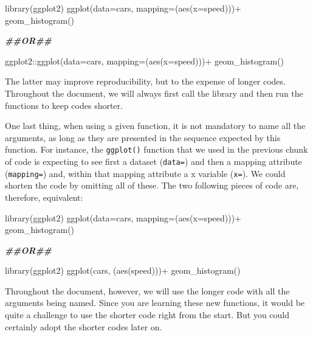 \documentclass[
]{book}
\newenvironment{Shaded}{\begin{snugshade}}{\end{snugshade}}
\newcommand{\AttributeTok}[1]{\textcolor[rgb]{0.77,0.63,0.00}{#1}}
\newcommand{\DocumentationTok}[1]{\textcolor[rgb]{0.56,0.35,0.01}{\textbf{\textit{#1}}}}
\newcommand{\FunctionTok}[1]{\textcolor[rgb]{0.00,0.00,0.00}{#1}}
\newcommand{\NormalTok}[1]{#1}
\newcommand{\SpecialCharTok}[1]{\textcolor[rgb]{0.00,0.00,0.00}{#1}}
\begin{document}
\begin{Shaded}
\begin{Highlighting}[]
\FunctionTok{library}\NormalTok{(ggplot2)}
\FunctionTok{ggplot}\NormalTok{(}\AttributeTok{data=}\NormalTok{cars, }\AttributeTok{mapping=}\NormalTok{(}\FunctionTok{aes}\NormalTok{(}\AttributeTok{x=}\NormalTok{speed)))}\SpecialCharTok{+}
  \FunctionTok{geom\_histogram}\NormalTok{()}

\DocumentationTok{\#\#OR\#\#}

\NormalTok{ggplot2}\SpecialCharTok{::}\FunctionTok{ggplot}\NormalTok{(}\AttributeTok{data=}\NormalTok{cars, }\AttributeTok{mapping=}\NormalTok{(}\FunctionTok{aes}\NormalTok{(}\AttributeTok{x=}\NormalTok{speed)))}\SpecialCharTok{+}
  \FunctionTok{geom\_histogram}\NormalTok{()}
\end{Highlighting}
\end{Shaded}

The latter may improve reproducibility, but to the expense of longer
codes. Throughout the document, we will always first call the library
and then run the functions to keep codes shorter.

One last thing, when using a given function, it is not mandatory to name
all the arguments, as long as they are presented in the sequence
expected by this function. For instance, the \texttt{ggplot()} function
that we used in the previous chunk of code is expecting to see first a
dataset (\texttt{data=}) and then a mapping attribute
(\texttt{mapping=}) and, within that mapping attribute a x variable
(\texttt{x=}). We could shorten the code by omitting all of these. The
two following pieces of code are, therefore, equivalent:

\begin{Shaded}
\begin{Highlighting}[]
\FunctionTok{library}\NormalTok{(ggplot2)}
\FunctionTok{ggplot}\NormalTok{(}\AttributeTok{data=}\NormalTok{cars, }\AttributeTok{mapping=}\NormalTok{(}\FunctionTok{aes}\NormalTok{(}\AttributeTok{x=}\NormalTok{speed)))}\SpecialCharTok{+}
  \FunctionTok{geom\_histogram}\NormalTok{()}

\DocumentationTok{\#\#OR\#\#  }

\FunctionTok{library}\NormalTok{(ggplot2)}
\FunctionTok{ggplot}\NormalTok{(cars, (}\FunctionTok{aes}\NormalTok{(speed)))}\SpecialCharTok{+}
  \FunctionTok{geom\_histogram}\NormalTok{()}
\end{Highlighting}
\end{Shaded}

Throughout the document, however, we will use the longer code with all
the arguments being named. Since you are learning these new functions,
it would be quite a challenge to use the shorter code right from the
start. But you could certainly adopt the shorter codes later on.
\end{document}
